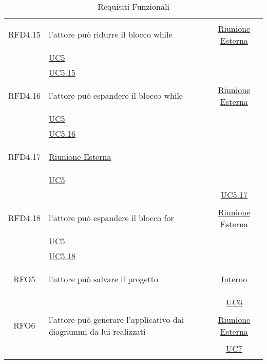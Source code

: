 \begin{longtable}{|c|>{\centering}m{7cm}|c|}
\hypertarget{RFD4.15}{RFD4.15} & l'attore può ridurre il blocco while & \hyperlink{Riunione Esterna}{Riunione Esterna}\\
& \hyperref[UC5]{UC5}\\
& \hyperref[UC5.15]{UC5.15}\\ \hline

\hypertarget{RFD4.16}{RFD4.16} & l'attore può espandere il blocco while & \hyperlink{Riunione Esterna}{Riunione Esterna}\\
& \hyperref[UC5]{UC5}\\
& \hyperref[UC5.16]{UC5.16}\\ \hline

\hypertarget{RFD4.17}{RFD4.17} & \hyperlink{Riunione Esterna}{Riunione Esterna}\\
& \hyperref[UC5]{UC5}\\
& & \hyperref[UC5.17]{UC5.17}\\ \hline

\hypertarget{RFD4.18}{RFD4.18} & l'attore può espandere il blocco for &  \hyperlink{Riunione Esterna}{Riunione Esterna}\\
& \hyperref[UC5]{UC5}\\
& \hyperref[UC5.18]{UC5.18}\\ \hline

\hypertarget{RFO5}{RFO5} & l'attore può salvare il progetto &  \hyperlink{Interno}{Interno}\\
& & \hyperref[UC6]{UC6}\\ \hline

\hypertarget{RFO6}{RFO6} & l'attore può generare l'applicativo dai diagrammi da lui realizzati & \hyperlink{Riunione Esterna}{Riunione Esterna}\\
& & \hyperref[UC7]{UC7}\\ \hline

\caption[Requisiti Funzionali]{Requisiti Funzionali}
\label{tabella:req0}
\end{longtable}
\clearpage

